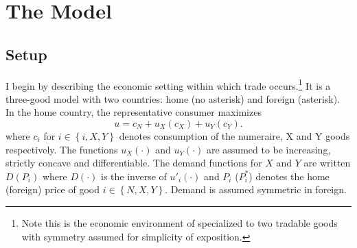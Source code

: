 \documentclass[12pt,titlepage]{article}
\begin{document}
\section{The Model}
\label{sec:stage}

\subsection{Setup}
\label{sec:economic}
I begin by describing the economic setting within which trade occurs.\footnote{Note this is the economic environment of \Textcite{gh95} specialized to two tradable goods with symmetry assumed for simplicity of exposition.} It is a three-good model with two countries: home (no asterisk) and foreign (asterisk). In the home country, the representative consumer maximizes
\[
  u = c_N + u_X(c_X) + u_Y(c_Y).
\]
where $c_i$ for $i \in \left\{i,X,Y\right\}$ denotes consumption of the numeraire, X and Y goods respectively. The functions $u_X(\cdot)$ and $u_Y(\cdot)$ are assumed to be increasing, strictly concave and differentiable. The demand functions for $X$ and $Y$ are written $D(P_i)$ where $D(\cdot)$ is the inverse of $u'_i(\cdot)$ and $P_i$ ($P_i^*$) denotes the home (foreign) price of good $i \in \left\{N,X,Y\right\}$. Demand is assumed symmetric in foreign.
\end{document}
